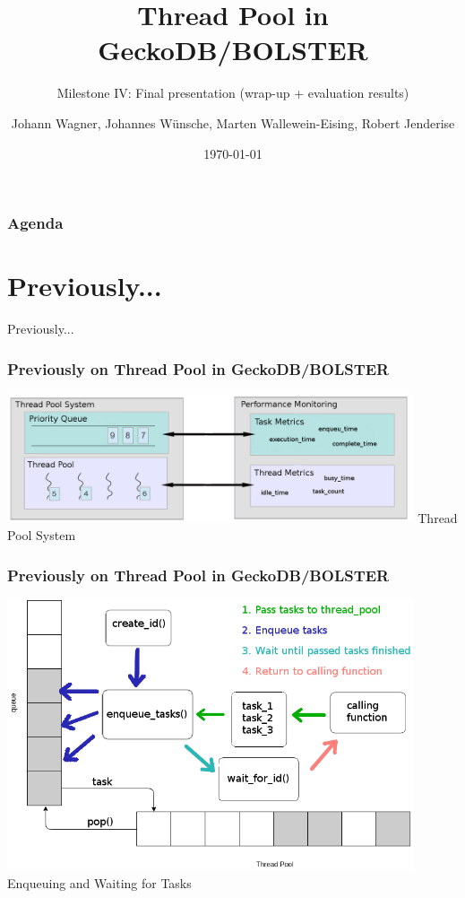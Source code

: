 \documentclass{beamer}
\title{Thread Pool in GeckoDB/BOLSTER}
\subtitle{Milestone IV: Final presentation (wrap-up + evaluation results) }
\author{Johann Wagner, Johannes Wünsche, Marten Wallewein-Eising, Robert Jenderise}
\date{\today}
\institute{Otto von Guericke University, Magdeburg}
\begin{document}
\begin{frame}[plain]
 \titlepage
\end{frame}

\section[Agenda]{}
	\begin{frame}
	\frametitle{Agenda}
	\tableofcontents
	\end{frame}

\section{Previously...}
\begin{frame}
	\begin{center}
		\huge Previously...
	\end{center}
\end{frame}

\begin{frame}
	\frametitle{Previously on Thread Pool in GeckoDB/BOLSTER}
	\begin{center}
		\includegraphics[width=0.9\textwidth]{img/pool_structure.png}
		Thread Pool System
	\end{center}
\end{frame}

\begin{frame}
	\frametitle{Previously on Thread Pool in GeckoDB/BOLSTER}
	\begin{center}
		\includegraphics[width=0.9\textwidth]{img/pool_queue.png}
		Enqueuing and Waiting for Tasks
	\end{center}
\end{frame}
\end{document}
